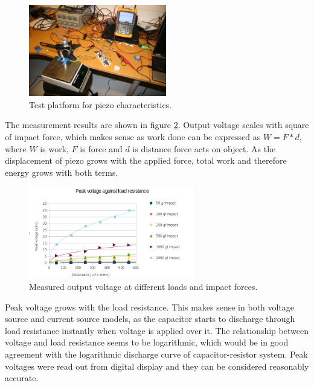 \begin{figure}[htb]
  \begin{center}
  \includegraphics[height=4cm]{images/own_pic/piezo_test}
  \end{center}
  \caption{Test platform for piezo characteristics.}
  \label{fiq:piezo_impact}
\end{figure}

The measurement results are shown in figure \ref{fiq:piezo_measurement_chart}. Output voltage scales with square of impact force, which makes sense as work done can be expressed as $W = F * d$, where $W$ is work, $F$ is force and $d$ is distance force acts on object. As the displacement of piezo grows with the applied force, total work and therefore energy grows with both terms. 

\begin{figure}[htb]
  \begin{center}
  \includegraphics[height=4cm]{images/own_measurement/piezo_measurements}
  \end{center}
  \caption{Measured output voltage at different loads and impact forces.}
  \label{fiq:piezo_measurement_chart}
\end{figure}

Peak voltage grows with the load resistance. This makes sense in both voltage source and current source models, as the capacitor starts to discharge through load resistance instantly when voltage is applied over it. The relationship between voltage and load resistance seems to be logarithmic, which would be in good agreement with the logarithmic discharge curve of capacitor-resistor system. Peak voltages were read out from digital display and they can be considered reasonably accurate.

